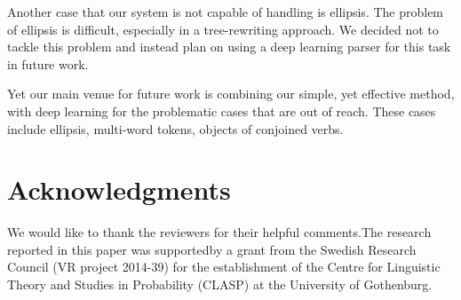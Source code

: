 \documentclass[11pt,a4paper]{article}
\begin{document}

Another case that our system is not capable of handling is
ellipsis. The problem of ellipsis is difficult, especially in a
tree-rewriting approach. We decided not to tackle this problem and
instead plan on using a deep learning parser for this task in future work.

Yet our main venue for future work is combining our simple, yet effective
method, with deep learning for the problematic cases that are out of
reach. These cases include ellipsis, multi-word tokens, objects of
conjoined verbs.




    
\section*{Acknowledgments}
We would like to thank the reviewers for their helpful
comments.The research reported in this paper was supportedby a
grant from the Swedish Research Council (VR project 2014-39) for
the establishment of the Centre for Linguistic Theory and Studies
in Probability (CLASP) at the University of Gothenburg.



\end{document}
